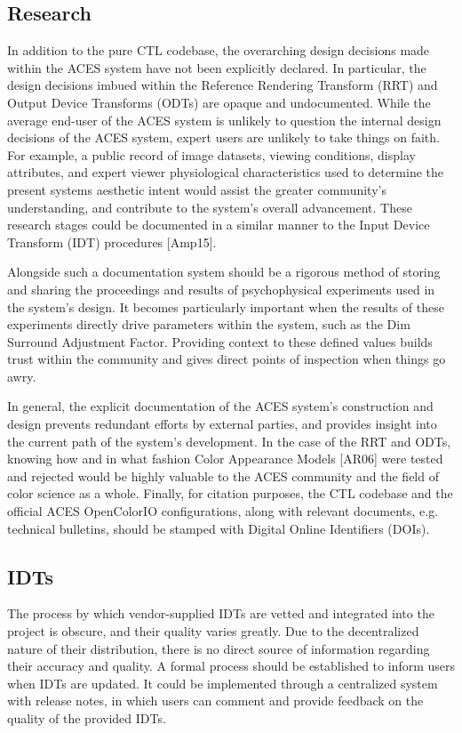 \documentclass[conference]{IEEEtran}
\begin{document}
\subsection{Research}
In addition to the pure CTL codebase, the overarching design decisions made within the ACES system have not been explicitly declared. In particular, the design decisions imbued within the Reference Rendering Transform (RRT) and Output Device Transforms (ODTs) are opaque and undocumented. While the average end-user of the ACES system is unlikely to question the internal design decisions of the ACES system, expert users are unlikely to take things on faith. For example, a public record of image datasets, viewing conditions, display attributes, and expert viewer physiological characteristics used to determine the present systems aesthetic intent would assist the greater community's understanding, and contribute to the system's overall advancement. These research stages could be documented in a similar manner to the Input Device Transform (IDT) procedures [Amp15].

Alongside such a documentation system should be a rigorous method of storing and sharing the proceedings and results of psychophysical experiments used in the system's design. It becomes particularly important when the results of these experiments directly drive parameters within the system, such as the Dim Surround Adjustment Factor. Providing context to these defined values builds trust within the community and gives direct points of inspection when things go awry.

In general, the explicit documentation of the ACES system's construction and design prevents redundant efforts by external parties, and provides insight into the current path of the system's development. In the case of the RRT and ODTs, knowing how and in what fashion Color Appearance Models [AR06] were tested and rejected would be highly valuable to the ACES community and the field of color science as a whole. Finally, for citation purposes, the CTL codebase and the official ACES OpenColorIO configurations, along with relevant documents, e.g. technical bulletins, should be stamped with Digital Online Identifiers (DOIs).

\subsection{IDTs}
The process by which vendor-supplied IDTs are vetted and integrated into the project is obscure, and their quality varies greatly. Due to the decentralized nature of their distribution, there is no direct source of information regarding their accuracy and quality. A formal process should be established to inform users when IDTs are updated. It could be implemented through a centralized system with release notes, in which users can comment and provide feedback on the quality of the provided IDTs.
\end{document}
